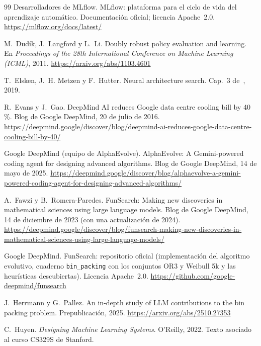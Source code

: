 \begin{thebibliography}{99}
Desarrolladores de MLflow.
\newblock MLflow: plataforma para el ciclo de vida del aprendizaje automático. Documentación oficial; licencia Apache~2.0.
\newblock \url{https://mlflow.org/docs/latest/}

M.~Dudík, J.~Langford y L.~Li.
\newblock Doubly robust policy evaluation and learning.
\newblock En \emph{Proceedings of the 28th International Conference on Machine Learning (ICML)}, 2011.
\newblock \url{https://arxiv.org/abs/1103.4601}

T.~Elsken, J.~H. Metzen y F.~Hutter.
\newblock Neural architecture search.
\newblock Cap.~3 de~\cite{automl}, 2019.

R.~Evans y J.~Gao.
\newblock DeepMind AI reduces Google data centre cooling bill by 40\,\%.
\newblock Blog de Google DeepMind, 20 de julio de 2016.
\newblock \url{https://deepmind.google/discover/blog/deepmind-ai-reduces-google-data-centre-cooling-bill-by-40/}

Google DeepMind (equipo de AlphaEvolve).
\newblock AlphaEvolve: A Gemini-powered coding agent for designing advanced algorithms.
\newblock Blog de Google DeepMind, 14 de mayo de 2025.
\newblock \url{https://deepmind.google/discover/blog/alphaevolve-a-gemini-powered-coding-agent-for-designing-advanced-algorithms/}

A.~Fawzi y B.~Romera-Paredes.
\newblock FunSearch: Making new discoveries in mathematical sciences using large language models.
\newblock Blog de Google DeepMind, 14 de diciembre de 2023 (con una actualización de 2024).
\newblock \url{https://deepmind.google/discover/blog/funsearch-making-new-discoveries-in-mathematical-sciences-using-large-language-models/}

Google DeepMind.
\newblock FunSearch: repositorio oficial (implementación del algoritmo evolutivo, cuaderno \texttt{bin\_packing} con los conjuntos OR3 y Weibull 5k y las heurísticas descubiertas). Licencia Apache~2.0.
\newblock \url{https://github.com/google-deepmind/funsearch}

J.~Herrmann y G.~Pallez.
\newblock An in-depth study of LLM contributions to the bin packing problem.
\newblock Prepublicación, 2025.
\newblock \url{https://arxiv.org/abs/2510.27353}

C.~Huyen.
\newblock \emph{Designing Machine Learning Systems}.
\newblock O'Reilly, 2022. Texto asociado al curso CS329S de Stanford.


\end{thebibliography}
